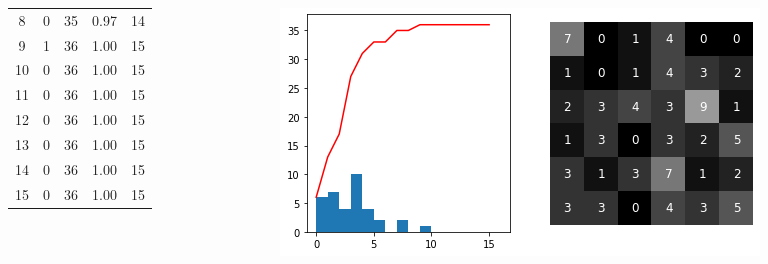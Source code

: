 \documentclass[9pt, aspectratio=169]{beamer}
\begin{document}
\begin{frame}
\begin{columns}
\begin{column}{.7\textwidth}
{\begin{tabular}{ccc<{\onslide<2->}c<{\onslide<3->}c<{\onslide}}
                    8                    & 0                         & 35                  & 0.97                             & 14                                                \\
                    9                    & 1                         & 36                  & 1.00                             & 15                                                \\
                    10                   & 0                         & 36                  & 1.00                             & 15                                                \\
                    11                   & 0                         & 36                  & 1.00                             & 15                                                \\
                    12                   & 0                         & 36                  & 1.00                             & 15                                                \\
                    13                   & 0                         & 36                  & 1.00                             & 15                                                \\
                    14                   & 0                         & 36                  & 1.00                             & 15                                                \\
                    15                   & 0                         & 36                  & 1.00                             & 15                                                \\
                    \hline
                \end{tabular}
            }
        \end{column}
        \begin{column}{.3\textwidth}
            \includegraphics[width=\textwidth]{normalised_histo_example_4bit_before.png}

\end{column}
\end{columns}
\end{frame}
\end{document}
